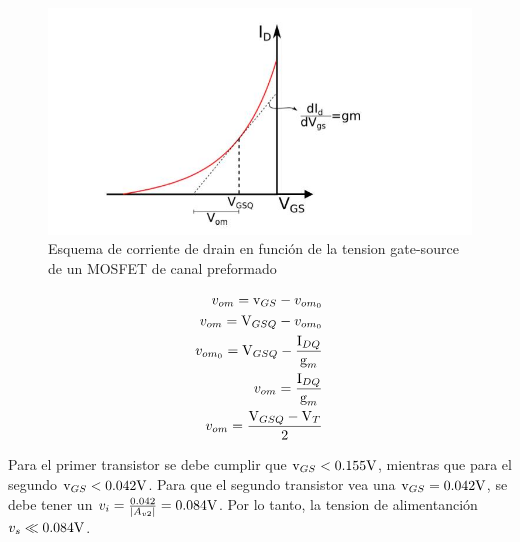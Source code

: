 \begin{figure}
	\centering
	\includegraphics[scale=0.5]{../img/distorsion.jpg}
	\caption{Esquema de corriente de drain en función de la tension gate-source de un MOSFET de canal preformado}
	\label{im:maximaExcursionSinDistorsion}
\end{figure}

\begin{eqnarray}
		v_{om} = \mbox{v}_{GS} - v_{om_0} \\
		v_{om} = \mbox{V}_{GSQ} - v_{om_0} \\
		v_{om_0}= \mbox{V}_{GSQ} - \frac{\mbox{I}_{DQ}}{\mbox{g}_m} \\
		v_{om} = \frac{\mbox{I}_{DQ}}{\mbox{g}_m} \\
		v_{om} = \frac{\mbox{V}_{GSQ} - \mbox{V}_T}{2}
\end{eqnarray}

Para el primer transistor se debe cumplir que $\mbox{v}_{GS} < 0.155\mbox{V}$, mientras que para el segundo $\mbox{v}_{GS} < 0.042\mbox{V}$. Para que el segundo transistor vea una $\mbox{v}_{GS} = 0.042\mbox{V}$, se debe tener un $v_i = \frac{0.042}{|A_{v2}|} = 0.084\mbox{V}$. Por lo tanto, la tension de alimentanción $v_s \ll 0.084\mbox{V}$.  